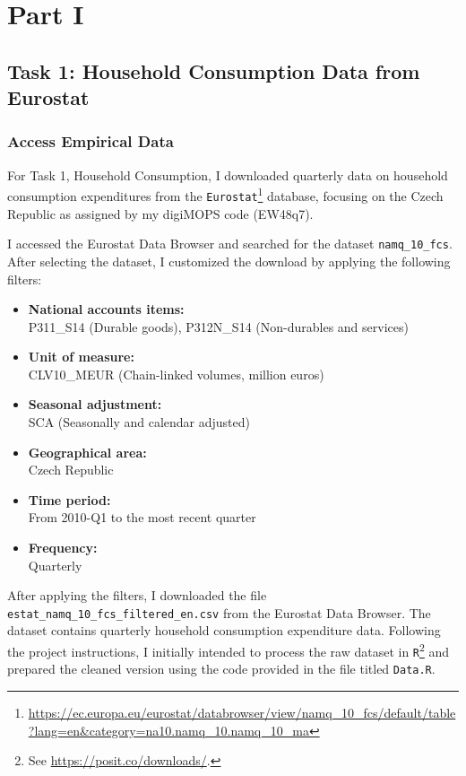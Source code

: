\documentclass[12pt,a4paper,notitlepage]{article}
\numberwithin{equation}{section}
\begin{document}
\section {Part I }

 \subsection{Task 1: Household Consumption Data from Eurostat} 
  \subsubsection {   Access Empirical Data}

For Task 1, Household Consumption, I downloaded quarterly data on household consumption expenditures from the \texttt{Eurostat}\footnote{\url{https://ec.europa.eu/eurostat/databrowser/view/namq_10_fcs/default/table?lang=en&category=na10.namq_10.namq_10_ma}} database, focusing on the Czech Republic as assigned by my digiMOPS code (EW48q7).


I accessed the Eurostat Data Browser and searched for the dataset \texttt{namq\_10\_fcs}. After selecting the dataset, I customized the download by applying the following filters:

\begin{itemize}
  \item \textbf{National accounts items:} \\
  P311\_S14 (Durable goods), P312N\_S14 (Non-durables and services)

  \item \textbf{Unit of measure:} \\
  CLV10\_MEUR (Chain-linked volumes, million euros)

  \item \textbf{Seasonal adjustment:} \\
  SCA (Seasonally and calendar adjusted)

  \item \textbf{Geographical area:} \\
  Czech Republic

  \item \textbf{Time period:} \\
  From 2010-Q1 to the most recent quarter

  \item \textbf{Frequency:} \\
  Quarterly
\end{itemize}

After applying the filters, I downloaded the file \texttt{estat\_namq\_10\_fcs\_filtered\_en.csv} from the Eurostat Data Browser. The dataset contains {quarterly household consumption expenditure data}. Following the project instructions, I initially intended to process the raw dataset in \texttt{R}\footnote{See \url{https://posit.co/downloads/}. } and prepared the cleaned version using the code provided in the file titled \texttt{Data.R}. 
\end{document}
